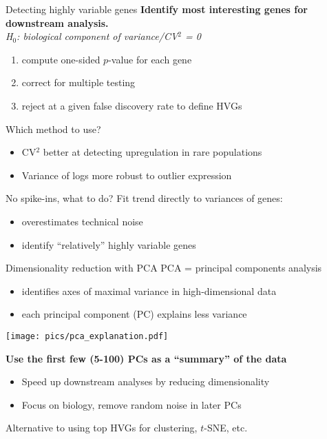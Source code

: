 \documentclass{beamer}
\begin{document}
\begin{frame}{Detecting highly variable genes}
\textbf{Identify most interesting genes for downstream analysis.}\\[0.1in]

\textit{H$_0$: biological component of variance/CV$^2$ = 0}
\begin{enumerate}
    \item compute one-sided $p$-value for each gene
    \item correct for multiple testing 
    \item reject at a given false discovery rate to define HVGs
\end{enumerate}

\begin{exampleblock}{Which method to use?}
    \begin{itemize}
        \item CV$^2$ better at detecting upregulation in rare populations
        \item Variance of logs more robust to outlier expression
    \end{itemize}
\end{exampleblock}
\pause
\begin{alertblock}{No spike-ins, what to do?}
    Fit trend directly to variances of genes:
    \begin{itemize}
        \item overestimates technical noise
        \item identify ``relatively'' highly variable genes
    \end{itemize}
\end{alertblock}
\end{frame}

\begin{frame}{Dimensionality reduction with PCA}
PCA = principal components analysis
\begin{itemize}
    \item identifies axes of maximal variance in high-dimensional data
    \item each principal component (PC) explains less variance 
\end{itemize}
\begin{center}
\texttt{[image: pics/pca\_explanation.pdf]}
\end{center}
\textbf{Use the first few (5-100) PCs as a ``summary'' of the data}
\begin{itemize}
\item Speed up downstream analyses by reducing dimensionality
\item Focus on biology, remove random noise in later PCs
\end{itemize}
\vspace{0.1in}
Alternative to using top HVGs for clustering, $t$-SNE, etc.
\end{frame}
\end{document}
